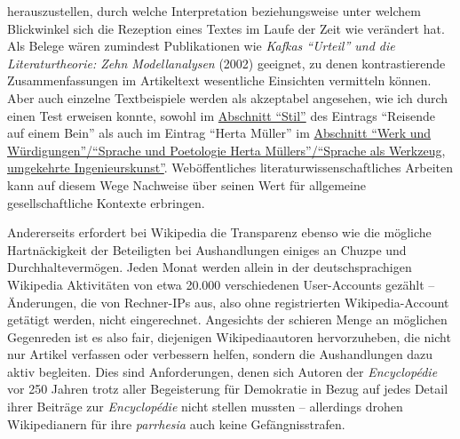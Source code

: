 \documentclass[fontsize=12pt]{scrartcl}
\begin{document}
he\-rauszustellen, durch welche Interpretation beziehungsweise unter welchem Blickwinkel sich die Rezeption eines Textes im Laufe der Zeit wie ver\"andert hat. Als Belege w\"aren zumindest Publikationen wie \textit{Kafkas "`Urteil"' und die Li\-te\-ra\-tur\-theorie: Zehn Modellana\-lysen} (2002) ge\-eig\-net, zu denen kontrastierende Zusammenfassungen im Artikeltext we\-sent\-liche Einsichten vermitteln k\"onnen. Aber auch einzelne Textbeispiele werden als akzeptabel angesehen, wie ich durch einen Test erweisen konnte, sowohl im \href{https://de.wikipedia.org/w/index.php?title=Reisende_auf_einem_Bein&oldid=137914805#Stil}{Abschnitt "`Stil"'} des Eintrags "`Reisende auf einem Bein"' als auch im Eintrag "`Herta M\"uller"' im \href{https://de.wikipedia.org/w/index.php?title=Herta_M\%C3\%BCller&oldid=137918366\#Sprache_und_Poetologie_Herta_M.C3.BCllers}{Abschnitt "`Werk und W\"urdigungen"'/"`Sprache und Poetologie Herta M\"ullers"'/"`Sprache als Werkzeug, \flq umgekehrte Ingenieurskunst\frq"'}. Web\"of\-fent\-liches li\-te\-ra\-tur\-wissenschaftliches Arbei\-ten kann auf diesem Wege Nachweise \"uber seinen Wert f\"ur allgemeine ge\-sell\-schaftliche Kontexte erbringen.

An\-de\-rerseits erfordert bei Wi\-ki\-pe\-dia die Transparenz ebenso wie die m\"ogliche Hartn\"ackigkeit der Beteiligten bei Aushandlungen einiges an Chuzpe und Durchhal\-te\-ver\-m\"ogen. Jeden Monat werden allein in der deutschspra\-chi\-gen Wi\-ki\-pe\-dia Ak\-ti\-vi\-t\"aten von etwa 20.000 verschiedenen User-Accounts gez\"ahlt -- \"Anderungen, die von Rechner-IPs aus, also ohne registrierten Wi\-ki\-pe\-dia-Account get\"atigt werden, nicht eingerechnet. Angesichts der schieren Menge an m\"oglichen Gegenreden ist es also fair, diejenigen Wi\-ki\-pe\-diaautoren\textsuperscript{\tiny *} hervorzuheben, die nicht nur Artikel verfassen oder verbessern helfen, sondern die Aushandlungen dazu aktiv beglei\-ten. Dies sind Anforderungen, denen sich Autoren\textsuperscript{\tiny *} der \textit{Encyclop\'{e}die} vor 250 Jahren trotz aller Begeisterung f\"ur Demokratie in Bezug auf jedes Detail ihrer Beitr\"age zur \textit{Encyclop\'{e}die} nicht stellen mussten -- al\-ler\-dings drohen Wi\-ki\-pe\-dianern\textsuperscript{\tiny *} f\"ur ihre \textit{parrhesia} auch keine Gef\"angnisstrafen. 
\end{document}

